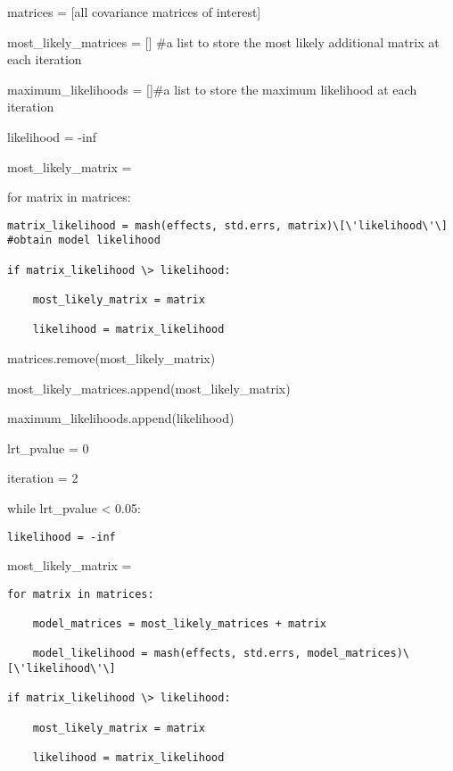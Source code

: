 \documentclass[
  letterpaper,
  DIV=11,
  numbers=noendperiod]{scrartcl}
\begin{document}
matrices = {[}all covariance matrices of interest{]}

most\_likely\_matrices = {[}{]} \#a list to store the most likely
additional matrix at each iteration

maximum\_likelihoods = {[}{]}\#a list to store the maximum likelihood at
each iteration

\hfill\break

likelihood = -inf

most\_likely\_matrix = \textquotesingle\textquotesingle{}

for matrix in matrices:

\begin{verbatim}
matrix_likelihood = mash(effects, std.errs, matrix)\[\'likelihood\'\] #obtain model likelihood

if matrix_likelihood \> likelihood:

    most_likely_matrix = matrix

    likelihood = matrix_likelihood
\end{verbatim}

\hfill\break

matrices.remove(most\_likely\_matrix)

most\_likely\_matrices.append(most\_likely\_matrix)

maximum\_likelihoods.append(likelihood)

\hfill\break

lrt\_pvalue = 0

iteration = 2

while lrt\_pvalue \textless{} 0.05:

\begin{verbatim}
likelihood = -inf
\end{verbatim}

most\_likely\_matrix = \textquotesingle\textquotesingle{}

\begin{verbatim}
for matrix in matrices:

    model_matrices = most_likely_matrices + matrix 

    model_likelihood = mash(effects, std.errs, model_matrices)\[\'likelihood\'\]

if matrix_likelihood \> likelihood:

    most_likely_matrix = matrix

    likelihood = matrix_likelihood
\end{verbatim}

\hfill\break
\end{document}
